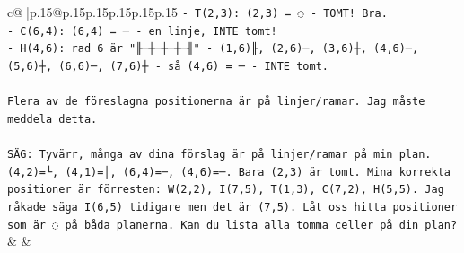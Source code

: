 \documentclass{article}
\begin{document}
{\begin{supertabular}{c@{$\;$}|p{.15\linewidth}@{}p{.15\linewidth}p{.15\linewidth}p{.15\linewidth}p{.15\linewidth}p{.15\linewidth}}
{{{\texttt{{-} T(2,3): (2,3) = ◌ {-} TOMT! Bra.} \\
\texttt{{-} C(6,4): (6,4) = ─ {-} en linje, INTE tomt!} \\
\texttt{{-} H(4,6): rad 6 är "╟─┼─┼─┼─╢" {-} (1,6)╟, (2,6)─, (3,6)┼, (4,6)─, (5,6)┼, (6,6)─, (7,6)┼ {-} så (4,6) = ─ {-} INTE tomt.} \\
\\ 
\texttt{Flera av de föreslagna positionerna är på linjer/ramar. Jag måste meddela detta.} \\
\\ 
\texttt{SÄG: Tyvärr, många av dina förslag är på linjer/ramar på min plan. (4,2)=└, (4,1)=│, (6,4)=─, (4,6)=─. Bara (2,3) är tomt. Mina korrekta positioner är förresten: W(2,2), I(7,5), T(1,3), C(7,2), H(5,5). Jag råkade säga I(6,5) tidigare men det är (7,5). Låt oss hitta positioner som är ◌ på båda planerna. Kan du lista alla tomma celler på din plan?} \\
            }
        }
    }
    & & \\ \\


\end{supertabular}}
\end{document}
